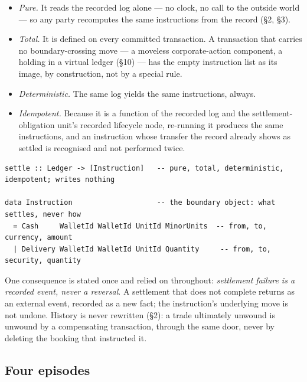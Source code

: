 \documentclass[11pt,a4paper]{article}
\begin{document}
\begin{itemize}[nosep]
\item \emph{Pure.} It reads the recorded log alone --- no clock, no call to the
outside world --- so any party recomputes the same instructions from the record
(\S2, \S3).
\item \emph{Total.} It is defined on every committed transaction. A transaction
that carries no boundary-crossing move --- a moveless corporate-action component, a
holding in a virtual ledger (\S10) --- has the empty instruction list as its image,
by construction, not by a special rule.
\item \emph{Deterministic.} The same log yields the same instructions, always.
\item \emph{Idempotent.} Because it is a function of the recorded log and the
settlement-obligation unit's recorded lifecycle node, re-running it produces the same
instructions, and an instruction whose transfer the record already shows as settled is
recognised and not performed twice.
\end{itemize}

\begin{lstlisting}
settle :: Ledger -> [Instruction]   -- pure, total, deterministic, idempotent; writes nothing

data Instruction                    -- the boundary object: what settles, never how
  = Cash     WalletId WalletId UnitId MinorUnits  -- from, to, currency, amount
  | Delivery WalletId WalletId UnitId Quantity     -- from, to, security, quantity
\end{lstlisting}

One consequence is stated once and relied on throughout: \emph{settlement failure
is a recorded event, never a reversal}. A settlement that does not complete returns
as an external event, recorded as a new fact; the instruction's underlying move is
not undone. History is never rewritten (\S2): a trade ultimately unwound is unwound
by a compensating transaction, through the same door, never by deleting the booking
that instructed it.

\subsection{Four episodes}
\end{document}
